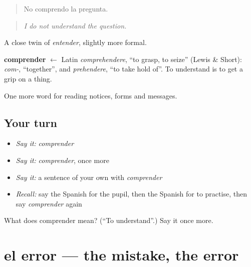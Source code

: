 \begin{quote}
No comprendo la pregunta.
\end{quote}

\begin{quote}
\emph{I do not understand the question.}
\end{quote}

A close twin of \emph{entender}, slightly more formal.

\begin{cousinweb}
\textbf{comprender} $\leftarrow$ Latin \emph{comprehendere}, \textquotedblleft{}to grasp, to seize\textquotedblright{} (Lewis \& Short): \emph{com-}, \textquotedblleft{}together\textquotedblright{}, and \emph{prehendere}, \textquotedblleft{}to take hold of\textquotedblright{}. To understand is to get a grip on a thing.
\end{cousinweb}

\begin{grammarlens}[title={What you've built}]
One more word for reading notices, forms and messages.
\end{grammarlens}

\subsection*{Your turn}
\begin{itemize}
\raggedright
  \item \emph{Say it:} \emph{comprender}
  \item \emph{Say it:} \emph{comprender}, once more
  \item \emph{Say it:} a sentence of your own with \emph{comprender}
  \item \emph{Recall:} say the Spanish for the pupil, then the Spanish for to practise, then say \emph{comprender} again
\end{itemize}

\begin{tcolorbox}[breakable,colback=teal!4,colframe=teal!35!black,title={Before you move on}]
What does comprender mean? (\textquotedblleft{}To understand\textquotedblright{}.) Say it once more.
\end{tcolorbox}
\section[el error]{el error — the mistake, the error}

\label{lesson:ES-C476-error}



